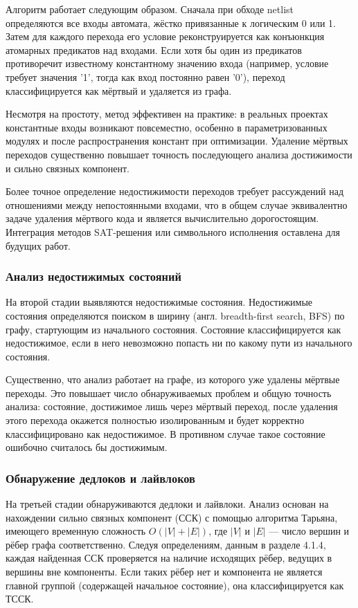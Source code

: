 Алгоритм работает следующим образом. Сначала при обходе netlist определяются все входы автомата,
жёстко привязанные к логическим 0 или 1. Затем для каждого перехода его условие реконструируется
как конъюнкция атомарных предикатов над входами. Если хотя бы один из предикатов противоречит
известному константному значению входа (например, условие требует значения '1', тогда как вход
постоянно равен '0'), переход классифицируется как мёртвый и удаляется из графа.

Несмотря на простоту, метод эффективен на практике: в реальных проектах константные входы возникают
повсеместно, особенно в параметризованных модулях и после распространения констант при оптимизации.
Удаление мёртвых переходов существенно повышает точность последующего анализа достижимости и сильно
связных компонент.

Более точное определение недостижимости переходов требует рассуждений над отношениями между
непостоянными входами, что в общем случае эквивалентно задаче удаления мёртвого кода и является
вычислительно дорогостоящим. Интеграция методов SAT-решения или символьного исполнения оставлена для
будущих работ.

\subsubsection{Анализ недостижимых состояний}

На второй стадии выявляются недостижимые состояния. Недостижимые состояния определяются поиском
в ширину (англ. breadth-first search, BFS) по графу, стартующим из начального состояния.
Состояние классифицируется как недостижимое, если в него невозможно попасть ни по какому
пути из начального состояния.

Существенно, что анализ работает на графе, из которого уже удалены мёртвые переходы. Это
повышает число обнаруживаемых проблем и общую точность анализа: состояние, достижимое лишь
через мёртвый переход, после удаления этого перехода окажется полностью изолированным и будет
корректно классифицировано как недостижимое. В противном случае такое состояние ошибочно
считалось бы достижимым.

\subsubsection{Обнаружение дедлоков и лайвлоков}

На третьей стадии обнаруживаются дедлоки и лайвлоки. Анализ основан на нахождении сильно
связных компонент (ССК) с помощью алгоритма Тарьяна, имеющего временную сложность
$O(|V| + |E|)$, где $|V|$ и $|E|$ --- число вершин и рёбер графа соответственно. Следуя
определениям, данным в разделе 4.1.4, каждая найденная ССК проверяется на наличие исходящих
рёбер, ведущих в вершины вне компоненты. Если таких рёбер нет и компонента не является
главной группой (содержащей начальное состояние), она классифицируется как ТССК.

